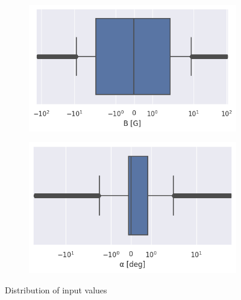 \begin{figure}[ht]
     \centering
     \begin{subfigure}[b]{0.32\textwidth}
         \centering
         \includegraphics[width=\textwidth]{figures/magnetic_field_boxplot.png}
     \end{subfigure}
     \hfill
     \begin{subfigure}[b]{0.32\textwidth}
         \centering
         \includegraphics[width=\textwidth]{figures/inclination_bp.png}
     \end{subfigure}
     \hfill
        \caption{Distribution of input values}
        \label{fig:input_distrib_bp}
\end{figure}


